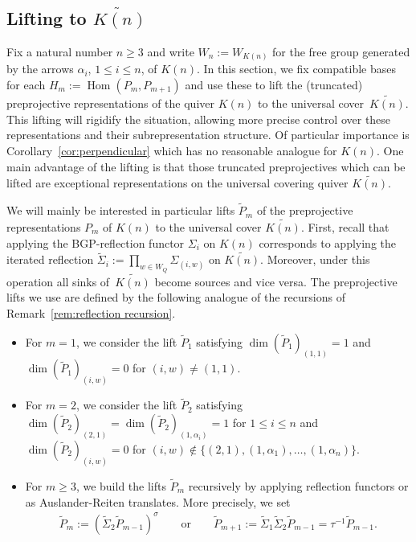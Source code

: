 \documentclass{amsart}
\numberwithin{equation}{section}
\newcommand{\Hom}{\operatorname{Hom}}
\begin{document}
\subsection{Lifting to $\widetilde{K(n)}$}
\label{Lifting}

Fix a natural number $n\geq 3$ and write $W_n:=W_{K(n)}$ for the free group generated by the arrows $\alpha_i$, $1\le i\le n$, of $K(n)$.
In this section, we fix compatible bases for each $H_m:=\Hom(P_m,P_{m+1})$ and use these to lift the (truncated) preprojective representations of the quiver $K(n)$ to the universal cover~$\widetilde{K(n)}$.
This lifting will rigidify the situation, allowing more precise control over these representations and their subrepresentation structure.
Of particular importance is Corollary~\ref{cor:perpendicular} which has no reasonable analogue for $K(n)$.
One main advantage of the lifting is that those truncated preprojectives which can be lifted are exceptional representations on the universal covering quiver $\widetilde{K(n)}$.

We will mainly be interested in particular lifts $\tilde P_m$ of the preprojective representations $P_m$ of $K(n)$ to the universal cover $\widetilde{K(n)}$.
First, recall that applying the BGP-reflection functor $\Sigma_i$ on $K(n)$ corresponds to applying the iterated reflection $\tilde\Sigma_i:=\prod_{w\in W_Q}\Sigma_{(i,w)}$ on $\widetilde{K(n)}$.
Moreover, under this operation all sinks of~$\widetilde{K(n)}$ become sources and vice versa.
The preprojective lifts we use are defined by the following analogue of the recursions of Remark~\ref{rem:reflection recursion}.
\begin{itemize}
  \item For $m=1$, we consider the lift $\tilde P_1$ satisfying $\dim(\tilde P_1)_{(1,1)}=1$ and $\dim (\tilde P_1)_{(i,w)}=0$ for $(i,w)\neq (1,1)$.
  \item For $m=2$, we consider the lift $\tilde P_2$ satisfying $\dim (\tilde P_2)_{(2,1)}=\dim (\tilde P_2)_{(1,\alpha_i)}=1$ for $1\le i\le n$ and $\dim(\tilde P_2)_{(i,w)}=0$ for $(i,w)\notin\{(2,1),(1,\alpha_1),\ldots,(1,\alpha_n)\}$.
  \item For $m\geq 3$, we build the lifts $\tilde P_m$ recursively by applying reflection functors or as Auslander-Reiten translates.
    More precisely, we set
    \begin{align}
      \label{eq:recursive covers}
      \tilde P_m:=(\tilde\Sigma_2 \tilde P_{m-1})^{\sigma}\qquad\text{or}\qquad\tilde P_{m+1}:=\tilde\Sigma_{1}\tilde\Sigma_2\tilde P_{m-1}=\tau^{-1} \tilde P_{m-1}.
    \end{align}
\end{itemize}
\end{document}

